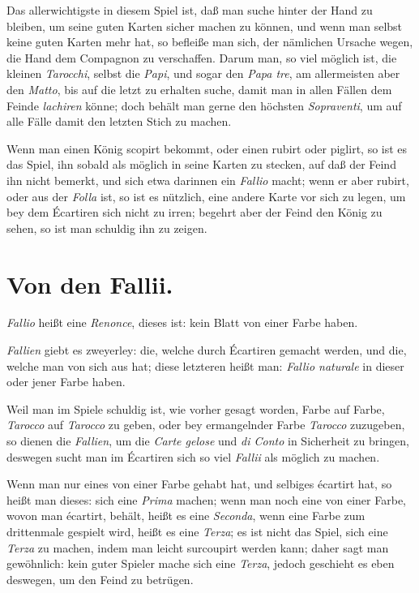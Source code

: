 \documentclass[11pt,a6paper,twoside]{article}
\begin{document}
Das allerwichtigste in diesem Spiel ist, daß man suche hinter der Hand zu bleiben, um seine guten Karten sicher machen zu können, und wenn man selbst keine guten Karten mehr hat, so befleiße man sich, der nämlichen Ursache wegen, die Hand dem Compagnon zu verschaffen. Darum man, so viel möglich ist, die kleinen \textit{Tarocchi}, selbst die \textit{Papi}, und sogar den \textit{Papa tre}, am allermeisten aber den \textit{Matto}, bis auf die letzt zu erhalten suche, damit man in allen Fällen dem Feinde \textit{lachiren} könne; doch behält man gerne den höchsten \textit{Sopraventi}, um auf alle Fälle damit den letzten Stich zu machen.

Wenn man einen König scopirt bekommt, oder einen rubirt oder piglirt, so ist es das Spiel, ihn sobald als möglich in seine Karten zu stecken, auf daß der Feind ihn nicht bemerkt, und sich etwa darinnen ein \textit{Fallio} macht; wenn er aber rubirt, oder aus der \textit{Folla} ist, so ist es nützlich, eine andere Karte vor sich zu legen, um bey dem Écartiren sich nicht zu irren; begehrt aber der Feind den König zu sehen, so ist man schuldig ihn zu zeigen.


\section{Von den Fallii.}

\textit{Fallio} heißt eine \textit{Renonce}, dieses ist: kein Blatt von einer Farbe haben.

\textit{Fallien} giebt es zweyerley: die, welche durch Écartiren gemacht werden, und die, welche man von sich aus hat; diese letzteren heißt man: \textit{Fallio naturale} in dieser oder jener Farbe haben.

Weil man im Spiele schuldig ist, wie vorher gesagt worden, Farbe auf Farbe, \textit{Tarocco} auf \textit{Tarocco} zu geben, oder bey ermangelnder Farbe \textit{Tarocco} zuzugeben, so dienen die \textit{Fallien}, um die \textit{Carte gelose} und \textit{di Conto} in Sicherheit zu bringen, deswegen sucht man im Écartiren sich so viel \textit{Fallii} als möglich zu machen.

Wenn man nur eines von einer Farbe gehabt hat, und selbiges écartirt hat, so heißt man dieses: sich eine \textit{Prima} machen; wenn man noch eine von einer Farbe, wovon man écartirt, behält, heißt es eine \textit{Seconda}, wenn eine Farbe zum drittenmale gespielt wird, heißt es eine \textit{Terza}; es ist nicht das Spiel, sich eine \textit{Terza} zu machen, indem man leicht surcoupirt werden kann; daher sagt man gewöhnlich: kein guter Spieler mache sich eine \textit{Terza}, jedoch geschieht es eben deswegen, um den Feind zu betrügen.
\end{document}
